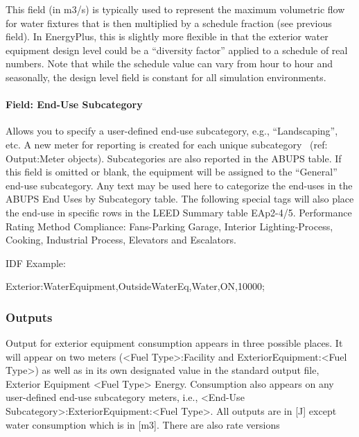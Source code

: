 This field (in m3/s) is typically used to represent the maximum volumetric flow for water fixtures that is then multiplied by a schedule fraction (see previous field). In EnergyPlus, this is slightly more flexible in that the exterior water equipment design level could be a ``diversity factor'' applied to a schedule of real numbers. Note that while the schedule value can vary from hour to hour and seasonally, the design level field is constant for all simulation environments.

\paragraph{Field: End-Use Subcategory}\label{field-end-use-subcategory-2}

Allows you to specify a user-defined end-use subcategory, e.g., ``Landscaping'', etc. A new meter for reporting is created for each unique subcategory~ (ref: Output:Meter objects). Subcategories are also reported in the ABUPS table. If this field is omitted or blank, the equipment will be assigned to the ``General'' end-use subcategory. Any text may be used here to categorize the end-uses in the ABUPS End Uses by Subcategory table. The following special tags will also place the end-use in specific rows in the LEED Summary table EAp2-4/5. Performance Rating Method Compliance:  Fans-Parking Garage, Interior Lighting-Process, Cooking, Industrial Process, Elevators and Escalators.

IDF Example:

Exterior:WaterEquipment,OutsideWaterEq,Water,ON,10000;

\subsubsection{Outputs}\label{outputs-1-010}

Output for exterior equipment consumption appears in three possible places. It will appear on two meters (\textless{}Fuel Type\textgreater{}:Facility and ExteriorEquipment:\textless{}Fuel Type\textgreater{}) as well as in its own designated value in the standard output file, Exterior Equipment \textless{}Fuel Type\textgreater{} Energy. Consumption also appears on any user-defined end-use subcategory meters, i.e., \textless{}End-Use Subcategory\textgreater{}:ExteriorEquipment:\textless{}Fuel Type\textgreater{}. All outputs are in {[}J{]} except water consumption which is in {[}m3{]}. There are also rate versions

